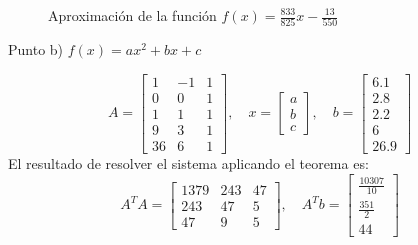 \documentclass{article}
\begin{document}
\begin{figure}[h]
    \centering
    \caption{Aproximación de la función $f(x) = \frac{833}{825}x - \frac{13}{550}$}
    \label{fig:myplot2}
\end{figure}
\begin{center}
    Punto b) $f(x) = ax^2 + bx + c$ \\
\end{center}
\begin{equation}
    A = \begin{bmatrix}
        1 & -1 & 1 \\
        0 & 0 & 1 \\
        1 & 1 & 1 \\
        9 & 3 & 1 \\
        36 & 6 & 1
    \end{bmatrix}, \quad x = \begin{bmatrix}
        a \\
        b \\
        c
    \end{bmatrix}, \quad b = \begin{bmatrix}
        6.1 \\
        2.8 \\
        2.2 \\
        6 \\
        26.9
    \end{bmatrix}
\end{equation}
El resultado de resolver el sistema aplicando el teorema es:
\begin{equation}
    A^TA = \begin{bmatrix}
        1379 & 243 & 47 \\
        243 & 47 & 5 \\
        47 & 9 & 5
    \end{bmatrix}, \quad A^Tb = \begin{bmatrix}
        \frac{10307}{10} \\
        \frac{351}{2} \\
        44
    \end{bmatrix}
\end{equation}
\end{document}
